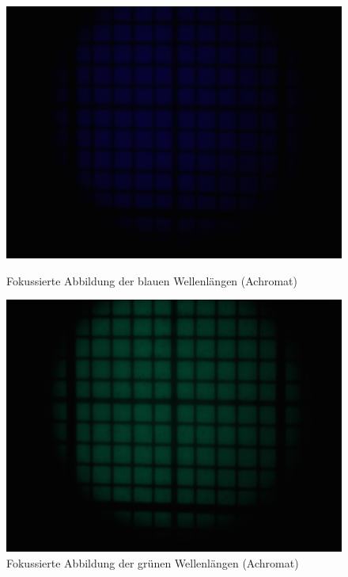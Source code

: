 \begin{figure}[htb]
	\begin{minipage}[t]{0.32\textwidth}
		\includegraphics[clip=true, trim=700px 950px 900px 250px, width=\linewidth]{img/ChromAbb/Prakt_Linsenfehler_2015_06_04_071}
		\caption{Fokussierte Abbildung der blauen Wellenlängen (Achromat)}
		\label{fig:cm_blau_achromat}
	\end{minipage}
	\hfill
	\begin{minipage}[t]{0.32\textwidth}
		\includegraphics[clip=true, trim=700px 950px 900px 250px, width=\linewidth]{img/ChromAbb/Prakt_Linsenfehler_2015_06_04_072}
		\caption{Fokussierte Abbildung der grünen Wellenlängen (Achromat)}
		\label{fig:cm_gruen_achromat}
	\end{minipage}
	\hfill
	\begin{minipage}[t]{0.32\textwidth}

\end{minipage}
\end{figure}

